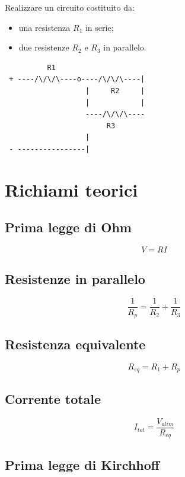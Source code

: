 \documentclass[a4paper,12pt]{article}
\begin{document}
Realizzare un circuito costituito da:

\begin{itemize}[itemsep=0pt, topsep=1pt]
    \item una resistenza $R_1$ in serie;
    \item due resistenze $R_2$ e $R_3$ in parallelo.
\end{itemize}

\vspace{0.5cm}

\begin{verbatim}
          R1
 + ----/\/\/\----o----/\/\/\----|
                   |     R2     |
                   |            |
                   ----/\/\/\----
                        R3
                   |
 - ----------------|
\end{verbatim}

\section*{Richiami teorici}

\subsection*{Prima legge di Ohm}

\[
V = RI
\]

\subsection*{Resistenze in parallelo}

\[
\frac{1}{R_p} = \frac{1}{R_2} + \frac{1}{R_3}
\]

\subsection*{Resistenza equivalente}

\[
R_{eq} = R_1 + R_p
\]

\subsection*{Corrente totale}

\[
I_{tot} = \frac{V_{alim}}{R_{eq}}
\]

\subsection*{Prima legge di Kirchhoff}
\end{document}
